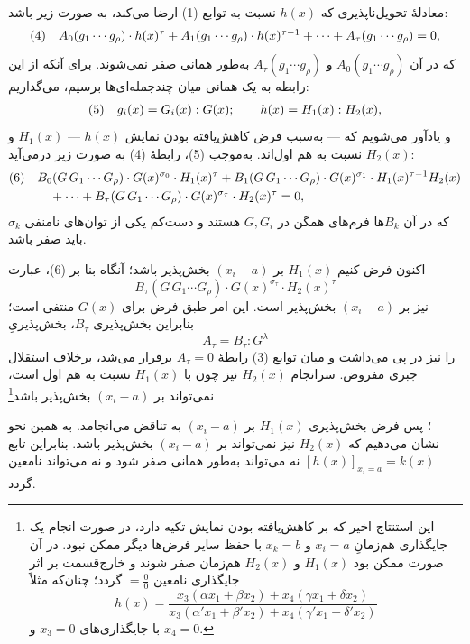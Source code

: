 \documentclass[11pt]{article}
\newcommand{\srcLTR}[1]{\relax\ifmmode\text{\mbox{\babelsublr{\foreignlanguage{english}{#1}}}}\else\babelsublr{\foreignlanguage{english}{#1}}\fi}
\newcommand{\srcfn}[2]{\begingroup\renewcommand{\thefootnote}{\srcLTR{#1}}\footnote{#2}\addtocounter{footnote}{-1}\endgroup}
\begin{document}
معادلهٔ تحویل‌ناپذیری که $h(x)$ نسبت به توابع (1) ارضا می‌کند، به صورت زیر باشد:
\[
\begin{array}{@{}r@{\quad}l@{}}
(4)& A_0(g_1\cdots g_\rho)\cdot h(x)^\tau
 +A_1(g_1\cdots g_\rho)\cdot h(x)^{\tau-1}
 +\cdots+A_\tau(g_1\cdots g_\rho)=0,
\end{array}
\]
که در آن $A_0(g_1\cdots g_\rho)$ و $A_\tau(g_1\cdots g_\rho)$ به‌طور همانی صفر نمی‌شوند. برای آنکه از این رابطه به یک همانی میان چندجمله‌ای‌ها برسیم، می‌گذاریم:
\[
\begin{array}{@{}r@{\quad}l@{}}
(5)& g_i(x)=G_i(x):G(x);\qquad h(x)=H_1(x):H_2(x),
\end{array}
\]
و یادآور می‌شویم که --- به‌سبب فرض کاهش‌یافته بودن نمایش $h(x)$ --- $H_1(x)$ و $H_2(x)$ نسبت به هم اول‌اند. به‌موجب (5)، رابطهٔ (4) به صورت زیر درمی‌آید:
\[
\begin{array}{@{}r@{\quad}l@{}}
(6)& \begin{aligned}[t]
&B_0(G\,G_1\cdots G_\rho)\cdot G(x)^{\sigma_0}\cdot H_1(x)^\tau
+B_1(G\,G_1\cdots G_\rho)\cdot G(x)^{\sigma_1}\cdot H_1(x)^{\tau-1}H_2(x)\\
&\quad+\cdots+B_\tau(G\,G_1\cdots G_\rho)\cdot G(x)^{\sigma_\tau}\cdot H_2(x)^\tau=0,
\end{aligned}
\end{array}
\]
که در آن $B_k$ها فرم‌های همگن در $G,G_i$ هستند و دست‌کم یکی از توان‌های نامنفی $\sigma_k$ باید صفر باشد.

اکنون فرض کنیم $H_1(x)$ بر $(x_i-a)$ بخش‌پذیر باشد؛ آنگاه بنا بر (6)، عبارت
\[
  B_\tau(G\,G_1\cdots G_\rho)\cdot G(x)^{\sigma_\tau}\cdot H_2(x)^\tau
\]
نیز بر $(x_i-a)$ بخش‌پذیر است. این امر طبق فرض برای $G(x)$ منتفی است؛ بنابراین بخش‌پذیری $B_\tau$، بخش‌پذیریِ
\[
  A_\tau=B_\tau:G^\lambda
\]
را نیز در پی می‌داشت و میان توابع (3) رابطهٔ $A_\tau=0$ برقرار می‌شد، برخلاف استقلال جبری مفروض.
سرانجام $H_2(x)$ نیز چون با $H_1(x)$ نسبت به هم اول است، نمی‌تواند بر $(x_i-a)$ بخش‌پذیر باشد\srcfn{*)}{این استنتاج اخیر که بر کاهش‌یافته بودن نمایش تکیه دارد، در صورت انجام یک جایگذاری هم‌زمانِ $x_i=a$ و $x_k=b$ با حفظ سایر فرض‌ها دیگر ممکن نبود. در آن صورت ممکن بود $H_1(x)$ و $H_2(x)$ هم‌زمان صفر شوند و خارج‌قسمت بر اثر جایگذاری نامعین $=\frac00$ گردد؛ چنان‌که مثلاً
\[
 h(x)=\frac{x_3(\alpha x_1+\beta x_2)+x_4(\gamma x_1+\delta x_2)}
 {x_3(\alpha' x_1+\beta' x_2)+x_4(\gamma' x_1+\delta' x_2)}
\]
با جایگذاری‌های $x_3=0$ و $x_4=0$.}؛ پس فرض بخش‌پذیری $H_1(x)$ بر $(x_i-a)$ به تناقض می‌انجامد. به همین نحو نشان می‌دهیم که $H_2(x)$ نیز نمی‌تواند بر $(x_i-a)$ بخش‌پذیر باشد. بنابراین تابع $[h(x)]_{x_i=a}=k(x)$ نه می‌تواند به‌طور همانی صفر شود و نه می‌تواند نامعین گردد.
\end{document}
